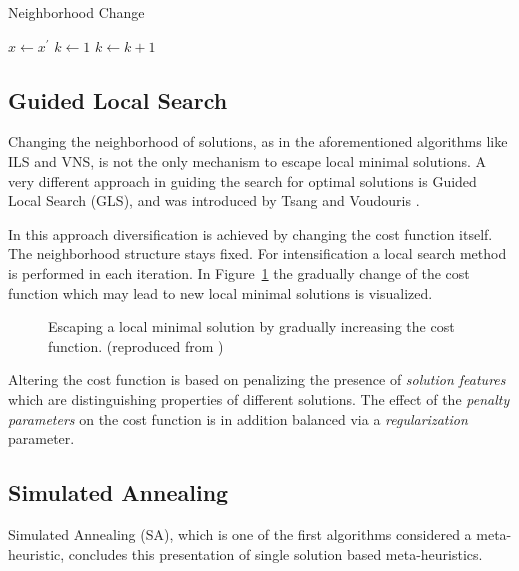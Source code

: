 \begin{algorithm}
\caption{Neighborhood Change}
\label{changealgo}
\begin{algorithmic}[1]
    \State $x\gets x^\prime$
    \State $k\gets 1$
\Else
    \State $k\gets k+1$
\EndIf

\EndFunction
\end{algorithmic}
\end{algorithm}

\subsection{Guided Local Search}
Changing the neighborhood of solutions, as in the aforementioned algorithms like ILS and VNS, is not the only mechanism to escape local minimal solutions.
A very different approach in guiding the search for optimal solutions is Guided Local Search (GLS), and was introduced by Tsang and Voudouris \cite{TsangVoudouris1997gls}\cite{TsangVoudouris1999gls}. 

In this approach diversification is achieved by changing the cost function itself. 
The neighborhood structure stays fixed. 
For intensification a local search method is performed in each iteration.
In Figure~\ref{fig:fig_gls} the gradually change of the cost function which may lead to new local minimal solutions is visualized. 
\begin{figure}[thpb] 
   \footnotesize
   \centering
    \def\svgwidth{0.75\textwidth}
    
    \caption[Escaping a local minimal solution by gradually increasing the cost function.]{Escaping a local minimal solution by gradually increasing the cost function. (reproduced from \cite{blum2003metaheuristics})}  
     \label{fig:fig_gls}
\end{figure}

Altering the cost function is based on penalizing the presence of \emph{solution features} which are distinguishing properties of different solutions. 
The effect of the \emph{penalty parameters} on the cost function is in addition balanced via a \emph{regularization} parameter.  

\subsection{Simulated Annealing}
Simulated Annealing (SA), which is one of the first algorithms considered a meta-heuristic, concludes this presentation of single solution based meta-heuristics. 

